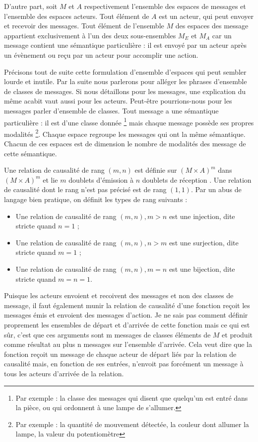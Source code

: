 \documentclass[11pt]{article}
\begin{document}
D'autre part, soit $M$ et $A$ respectivement l'ensemble des espaces de messages et l'ensemble des espaces acteurs. Tout élément de $A$ est un acteur, qui peut envoyer et recevoir des messages. Tout élément de l'ensemble $M$ des espaces des message appartient exclusivement à l'un des deux sous-ensembles $M_E$ et $M_A$ car un message contient une sémantique particulière : il est envoyé par un acteur après un évènement ou reçu par un acteur pour accomplir une action.

Précisons tout de suite cette formulation d'\og ensemble d'espaces \fg{} qui peut sembler lourde et inutile. Par la suite nous parlerons pour alléger les phrases d'ensemble de classes de messages. Si nous détaillons pour les messages, une explication du même acabit vaut aussi pour les acteurs. Peut-être pourrions-nous pour les messages parler d'ensemble de classes. Tout message a une sémantique particulière : il est d'une classe donnée \footnote{Par exemple : la classe des messages qui disent que quelqu'un est entré dans la pièce, ou qui ordonnent à une lampe de s'allumer.} mais chaque message possède ses propres modalités \footnote{Par exemple : la quantité de mouvement détectée, la couleur dont allumer la lampe, la valeur du potentiomètre}. Chaque espace regroupe les messages qui ont la même sémantique. Chacun de ces espaces est de dimension le nombre de modalités des message de cette sémantique.

Une relation de causalité de rang $(m, n)$ est définie sur $\left(M\times A\right)^m$ dans $\left(M\times A\right)^m$ et lie $m$ doublets \og d'émission \fg{} à $n$ doublets \og de réception \fg{}. Une relation de causalité dont le rang n'est pas précisé est de rang $(1, 1)$. Par un abus de langage bien pratique, on définit les types de rang suivants :
\begin{itemize}
\item Une relation de causalité de rang $(m, n), m > n$ est une injection, dite stricte quand $n = 1$ ;
\item Une relation de causalité de rang $(m, n), n > m$ est une surjection, dite stricte quand $m = 1$ ;
\item Une relation de causalité de rang $(m, n), m = n$ est une bijection, dite stricte quand $m = n = 1$.
\end{itemize}

Puisque les acteurs envoient et recoivent des messages et non des classes de message, il faut également munir la relation de causalité d'une fonction reçoit les messages émis et envoient des messages d'action. Je ne sais pas comment définir proprement les ensembles de départ et d'arrivée de cette fonction mais ce qui est sûr, c'est que ces arguments sont m messages de classes éléments de $M$ et produit comme résultat au plus n messages sur l'ensemble d'arrivée. Cela veut dire que la fonction reçoit un message de chaque acteur de départ liés par la relation de causalité mais, en fonction de ses entrées, n'envoit pas forcément un message à tous les acteurs d'arrivée de la relation.
\end{document}
